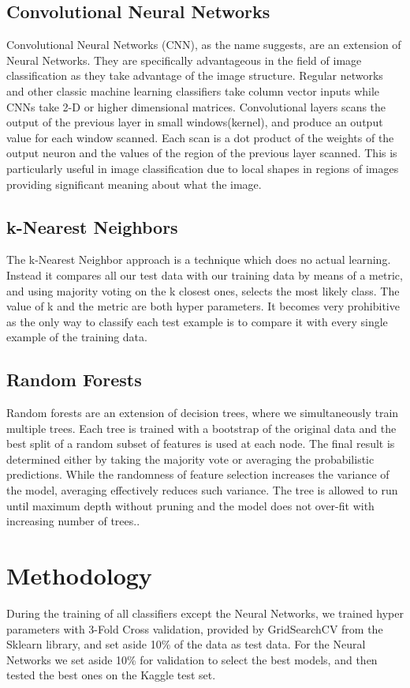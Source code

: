 \documentclass[twoside,twocolumn]{article}
\begin{document}
\subsection{Convolutional Neural Networks}
Convolutional Neural Networks (CNN), as the name suggests, are an extension of Neural Networks. They are specifically advantageous in the field of image classification as they take advantage of the image structure. Regular networks and other classic machine learning classifiers take column vector inputs while CNNs take 2-D or higher dimensional matrices. Convolutional layers scans the output of the previous layer in small windows(kernel), and produce an output value for each window scanned. Each scan is a dot product of the weights of the output neuron and the values of the region of the previous layer scanned. This is particularly useful in image classification due to local shapes in regions of images providing significant meaning about what the image.
\subsection{k-Nearest Neighbors}
The k-Nearest Neighbor\cite{StatBook} approach is a technique which does no actual learning. Instead it compares all our test data with our training data by means of a metric, and using majority voting on the k closest ones, selects the most likely class. The value of k and the metric are both hyper parameters. It becomes very prohibitive as the only way to classify each test example is to compare it with every single example of the training data.
\subsection{Random Forests}
Random forests are an extension of decision trees, where we simultaneously train multiple trees. Each tree is trained with a bootstrap of the original data and the best split of a random subset of features is used at each node. The final result is determined either by taking the majority vote or averaging the probabilistic predictions. While the randomness of feature selection increases the variance of the model, averaging effectively reduces such variance. The tree is allowed to run until maximum depth without pruning and the model does not over-fit with increasing number of trees.\cite{Random Forest}. 


\section{Methodology}
During the training of all classifiers except the Neural Networks, we trained hyper parameters with 3-Fold Cross validation, provided by GridSearchCV from the Sklearn library, and set aside 10\% of the data as test data. For the Neural Networks we set aside 10\% for validation to select the best models, and then tested the best ones on the Kaggle test set. 
\end{document}

